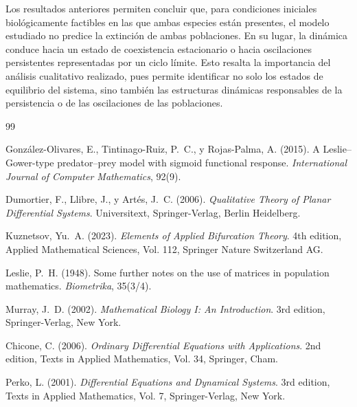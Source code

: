 \documentclass[]{article}
\theoremstyle{remark}
\begin{document}
\noindent Los resultados anteriores permiten concluir que, para condiciones iniciales biológicamente factibles en las que ambas especies están presentes, el modelo estudiado no predice la extinción de ambas poblaciones. En su lugar, la dinámica conduce hacia un estado de coexistencia estacionario o hacia oscilaciones persistentes representadas por un ciclo límite. Esto resalta la importancia del análisis cualitativo realizado, pues permite identificar no solo los estados de equilibrio del sistema, sino también las estructuras dinámicas responsables de la persistencia o de las oscilaciones de las poblaciones. \\

\begin{thebibliography}{99}
	
	González-Olivares, E., Tintinago-Ruiz, P.~C., y Rojas-Palma, A. (2015).
	\newblock A {L}eslie--{G}ower-type predator--prey model with sigmoid functional response.
	\newblock \emph{International Journal of Computer Mathematics}, 92(9).
	
	Dumortier, F., Llibre, J., y Artés, J.~C. (2006).
	\newblock \emph{Qualitative Theory of Planar Differential Systems}.
	\newblock Universitext, Springer-Verlag, Berlin Heidelberg.
	
	Kuznetsov, Yu.~A. (2023).
	\newblock \emph{Elements of Applied Bifurcation Theory}.
	\newblock 4th edition, Applied Mathematical Sciences, Vol. 112, Springer Nature Switzerland AG.
	
	Leslie, P.~H. (1948).
	\newblock Some further notes on the use of matrices in population mathematics.
	\newblock \emph{Biometrika}, 35(3/4).
	
	Murray, J.~D. (2002).
	\newblock \emph{Mathematical Biology I: An Introduction}.
	\newblock 3rd edition, Springer-Verlag, New York.
	
	Chicone, C. (2006).
	\newblock \emph{Ordinary Differential Equations with Applications}.
	\newblock 2nd edition, Texts in Applied Mathematics, Vol. 34, Springer, Cham.
	
	Perko, L. (2001).
	\newblock \emph{Differential Equations and Dynamical Systems}.
	\newblock 3rd edition, Texts in Applied Mathematics, Vol. 7, Springer-Verlag, New York.

\end{thebibliography}
\end{document}
